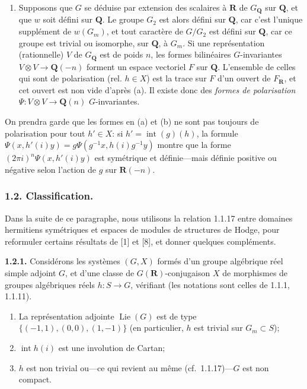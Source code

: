 \documentclass[10pt,a4paper]{article}
\providecommand{\tightlist}{\setlength{\itemsep}{0pt}\setlength{\parskip}{0pt}}
\newcommand{\SourcePage}[2]{\clearpage\setcounter{page}{#2}\typeout{D031_SOURCE_PAGE physical=#1 printed=#2}}
\begin{document}
\begin{enumerate}
\def\labelenumi{(\alph{enumi})}
\setcounter{enumi}{1}
\tightlist
\item
  Supposons que \(G\) se déduise par extension des scalaires à \(\mathbf R\) de \(G_{\mathbf Q}\) sur \(\mathbf Q\), et que \(w\) soit défini sur \(\mathbf Q\). Le groupe \(G_2\) est alors défini sur \(\mathbf Q\), car c'est l'unique supplément de \(w(G_m)\), et tout caractère de \(G/G_2\) est défini sur \(\mathbf Q\), car ce groupe est trivial ou isomorphe, sur \(\mathbf Q\), à \(G_m\). Si une représentation (rationnelle) \(V\) de \(G_{\mathbf Q}\) est de poids \(n\), les formes bilinéaires \(G\)-invariantes \(V\otimes V\to\mathbf Q(-n)\) forment un espace vectoriel \(F\) sur \(\mathbf Q\). L'ensemble de celles qui sont de polarisation (rel. \(h\in X\)) est la trace sur \(F\) d'un ouvert de \(F_{\mathbf R}\), et cet ouvert est non vide d'après (a). Il existe donc des \emph{formes de polarisation} \(\Psi:V\otimes V\to\mathbf Q(n)\) \(G\)-invariantes.
\end{enumerate}

\SourcePage{11}{257}
On prendra garde que les formes en (a) et (b) ne sont pas toujours de polarisation pour tout \(h'\in X\): si \(h'=\operatorname{int}(g)(h)\), la formule \(\Psi(x,h'(i)y)=g\Psi(g^{-1}x,h(i)g^{-1}y)\) montre que la forme \((2\pi i)^n\Psi(x,h'(i)y)\) est symétrique et définie---mais définie positive ou négative selon l'action de \(g\) sur \(\mathbf R(-n)\).

\subsubsection{1.2. Classification.}

Dans la suite de ce paragraphe, nous utilisons la relation 1.1.17 entre domaines hermitiens symétriques et espaces de modules de structures de Hodge, pour reformuler certains résultats de {[}1{]} et {[}8{]}, et donner quelques compléments.

\textbf{1.2.1.} Considérons les systèmes \((G,X)\) formés d'un groupe algébrique réel simple adjoint \(G\), et d'une classe de \(G(\mathbf R)\)-conjugaison \(X\) de morphismes de groupes algébriques réels \(h:S\to G\), vérifiant (les notations sont celles de 1.1.1, 1.1.11).

\begin{enumerate}
\def\labelenumi{(\roman{enumi})}
\item
  La représentation adjointe \(\operatorname{Lie}(G)\) est de type \(\{(-1,1),(0,0),(1,-1)\}\) (en particulier, \(h\) est trivial sur \(G_m\subset S\));
\item
  \(\operatorname{int}h(i)\) est une involution de Cartan;
\item
  \(h\) est non trivial ou---ce qui revient au même (cf.~1.1.17)---\(G\) est non compact.
\end{enumerate}
\end{document}
